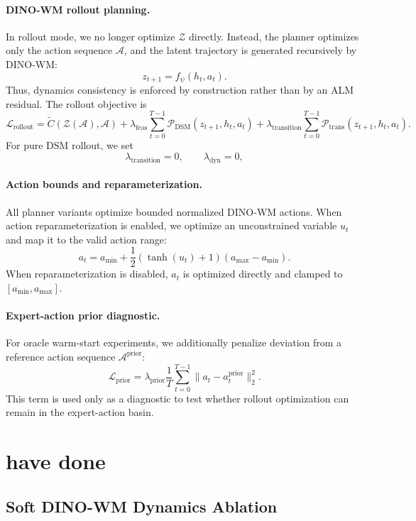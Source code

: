 \paragraph{DINO-WM rollout planning.}
In rollout mode, we no longer optimize \(\mathcal{Z}\) directly. Instead, the planner optimizes only the action sequence \(\mathcal{A}\), and the latent trajectory is generated recursively by DINO-WM:
\[
z_{t+1}=f_\psi(h_t,a_t).
\]
Thus, dynamics consistency is enforced by construction rather than by an ALM residual. The rollout objective is
\[
\mathcal{L}_{\mathrm{rollout}}
=
\tilde C(\mathcal{Z}(\mathcal{A}),\mathcal{A})
+
\lambda_{\mathrm{feas}}
\sum_{t=0}^{T-1}
\mathcal{P}_{\mathrm{DSM}}(z_{t+1},h_t,a_t)
+
\lambda_{\mathrm{transition}}
\sum_{t=0}^{T-1}
\mathcal{P}_{\mathrm{trans}}(z_{t+1},h_t,a_t).
\]
For pure DSM rollout, we set
\[
\lambda_{\mathrm{transition}}=0,
\qquad
\lambda_{\mathrm{dyn}}=0,
\]


\paragraph{Action bounds and reparameterization.}
All planner variants optimize bounded normalized DINO-WM actions. When action reparameterization is enabled, we optimize an unconstrained variable \(u_t\) and map it to the valid action range:
\[
a_t
=
a_{\min}
+
\frac{1}{2}
\left(\tanh(u_t)+1\right)
(a_{\max}-a_{\min}).
\]
When reparameterization is disabled, \(a_t\) is optimized directly and clamped to
\([a_{\min},a_{\max}]\).

\paragraph{Expert-action prior diagnostic.}
For oracle warm-start experiments, we additionally penalize deviation from a reference action sequence \(\mathcal{A}^{\mathrm{prior}}\):
\[
\mathcal{L}_{\mathrm{prior}}
=
\lambda_{\mathrm{prior}}
\frac{1}{T}
\sum_{t=0}^{T-1}
\|a_t-a_t^{\mathrm{prior}}\|_2^2 .
\]
This term is used only as a diagnostic to test whether rollout optimization can remain in the expert-action basin.


\section{have done}
\subsection{Soft DINO-WM Dynamics Ablation}
\label{app:soft_dynamics_ablation}

